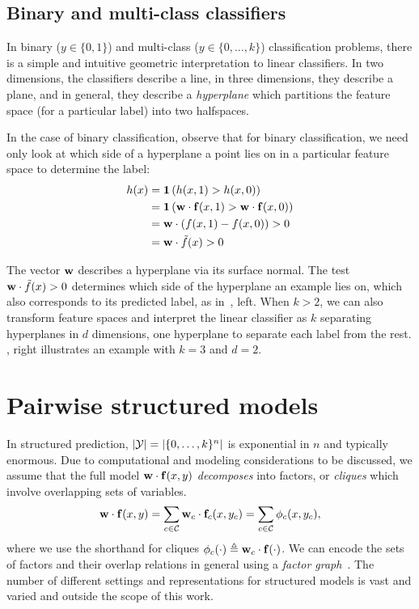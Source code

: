 \subsection{Binary and multi-class classifiers}
\label{sec:binary-multi-class}
In binary ($y \in \{0,1\}$) and multi-class ($y \in \{0,\ldots,k\}$) 
classification problems, there is a simple and intuitive geometric 
interpretation to linear classifiers.  In two dimensions, the classifiers 
describe a line, in three dimensions, they describe a plane, and in general, 
they describe a {\em hyperplane} which partitions the feature space (for a 
particular label) into two halfspaces.  

In the case of binary classification, observe that for binary classification, 
we need only look at which side of a hyperplane a point lies on in a particular 
feature space to determine the label:
\begin{align}
h(x) &= \mathbf{1}\left( h(x,1) > h(x,0)\right) \\
&= \mathbf{1}\left( \mathbf{w} \cdot \mathbf{f}(x,1) > \mathbf{w} \cdot \mathbf{f}(x,0) \right) \\
&= \mathbf{w} \cdot \left(f(x,1) - f(x,0)\right)  > 0\\ 
&= \mathbf{w} \cdot \tilde{f}(x) > 0 
\end{align}

The vector $\mathbf{w}$ describes a hyperplane via its surface normal.  The test $\mathbf{w} 
\cdot \tilde{f}(x) > 0$ determines which side of the hyperplane an example lies 
on, which also corresponds to its predicted label, as 
in~, left.  When $k > 2$, we can also transform 
feature spaces and interpret the linear classifier as $k$ separating 
hyperplanes in $d$ dimensions, one hyperplane to separate each label from the 
rest.  , right illustrates an example with $k = 3$ 
and $d = 2$.

\section{Pairwise structured models}
\label{sec:mrfs}
In structured prediction, $|\mathcal{Y}| = |\{0,\ldots,k\}^n|$ is exponential in $n$ 
and typically enormous. Due to computational and modeling considerations to be 
discussed, we assume that the full model $\mathbf{w} \cdot \mathbf{f}(x,y)$ {\em decomposes} 
into factors, or {\em cliques} which involve overlapping sets of variables.  
\begin{equation}
\mathbf{w} \cdot \mathbf{f}(x,y) = \sum_{c \in \mathcal{C}} \mathbf{w}_c \cdot \mathbf{f}_c(x,y_c) = \sum_{c \in \mathcal{C}} 
\phi_c(x,y_c),
\end{equation}
where we use the shorthand for cliques $\phi_c(\cdot) \triangleq \mathbf{w}_c \cdot 
\mathbf{f}(\cdot)$.
We can encode the sets of factors and their overlap relations in general using 
a {\em factor graph}~\citep{koller-book}.  The number of different settings and 
representations for structured models is vast and varied and outside the scope 
of this work.  

